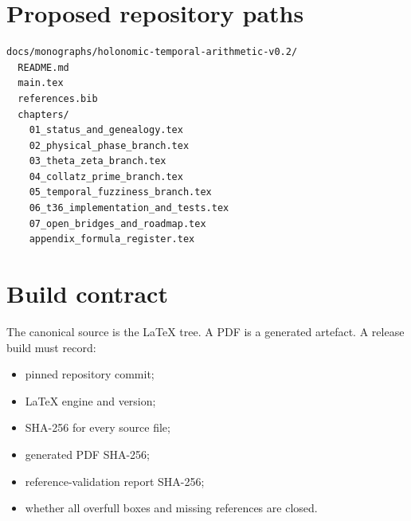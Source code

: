 \section{Proposed repository paths}

\begin{lstlisting}[basicstyle=\ttfamily\small,frame=single,breaklines=true]
docs/monographs/holonomic-temporal-arithmetic-v0.2/
  README.md
  main.tex
  references.bib
  chapters/
    01_status_and_genealogy.tex
    02_physical_phase_branch.tex
    03_theta_zeta_branch.tex
    04_collatz_prime_branch.tex
    05_temporal_fuzziness_branch.tex
    06_t36_implementation_and_tests.tex
    07_open_bridges_and_roadmap.tex
    appendix_formula_register.tex
\end{lstlisting}

\section{Build contract}

The canonical source is the LaTeX tree. A PDF is a generated artefact. A release build must record:
\begin{itemize}[leftmargin=2em]
\item pinned repository commit;
\item LaTeX engine and version;
\item SHA-256 for every source file;
\item generated PDF SHA-256;
\item reference-validation report SHA-256;
\item whether all overfull boxes and missing references are closed.
\end{itemize}
